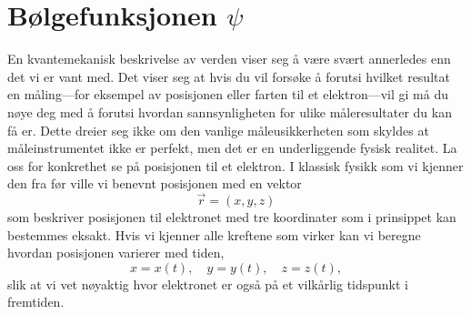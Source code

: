 \section{Bølgefunksjonen $\psi$}
\label{sec:kvante:psi}
En kvantemekanisk beskrivelse av verden viser seg å være svært annerledes enn det vi er vant med. Det viser seg at hvis du vil forsøke å forutsi hvilket resultat en måling---for eksempel av posisjonen eller farten til et elektron---vil gi må du nøye deg med å forutsi hvordan sannsynligheten for ulike måleresultater du kan få er. Dette dreier seg ikke om den vanlige måleusikkerheten som skyldes at måleinstrumentet ikke er perfekt, men det er en underliggende fysisk realitet. La oss for konkrethet se på posisjonen til et elektron. I klassisk fysikk som vi kjenner den fra før ville vi benevnt posisjonen med en vektor
\begin{displaymath}
	\vec{r} = (x,y,z)
\end{displaymath}
som beskriver posisjonen til elektronet med tre koordinater som i prinsippet kan bestemmes eksakt. Hvis vi kjenner alle kreftene som virker kan vi beregne hvordan posisjonen varierer med tiden,
\begin{displaymath}
	x = x(t),\quad y = y(t),\quad z=z(t),
\end{displaymath}
slik at vi vet nøyaktig hvor elektronet er også på et vilkårlig tidspunkt i fremtiden.

